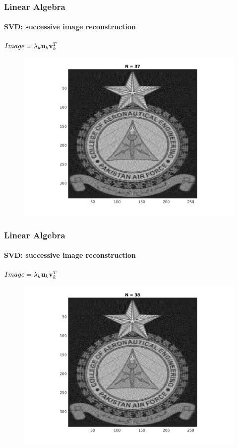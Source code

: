 \documentclass[hyperref={pdfpagelabels=true}]{beamer}
\begin{document}
\begin{frame}
\frametitle{Linear Algebra}
\framesubtitle{SVD: successive image reconstruction} 
\small{
\begin{center}
$Image = \lambda_k{\bf u}_k {\bf v}_k^T$
\end{center}}
\begin{figure}[!htb]
\centering
\includegraphics [scale=0.48]{n/b37.png}
\end{figure}
\end{frame}

\begin{frame}
\frametitle{Linear Algebra}
\framesubtitle{SVD: successive image reconstruction} 
\small{
\begin{center}
$Image = \lambda_k{\bf u}_k {\bf v}_k^T$
\end{center}}
\begin{figure}[!htb]
\centering
\includegraphics [scale=0.48]{n/b38.png}
\end{figure}
\end{frame}
\end{document}
